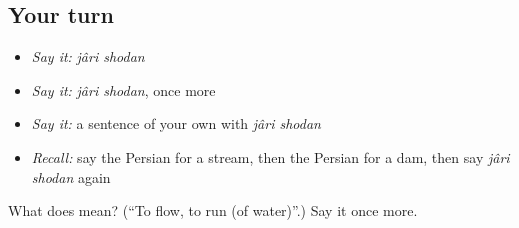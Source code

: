 \subsection*{Your turn}
\begin{itemize}
\raggedright
  \item \emph{Say it:} \emph{jâri shodan}
  \item \emph{Say it:} \emph{jâri shodan}, once more
  \item \emph{Say it:} a sentence of your own with \emph{jâri shodan}
  \item \emph{Recall:} say the Persian for a stream, then the Persian for a dam, then say \emph{jâri shodan} again
\end{itemize}

\begin{tcolorbox}[breakable,colback=teal!4,colframe=teal!35!black,title={Before you move on}]
What does   mean? (\textquotedblleft{}To flow, to run (of water)\textquotedblright{}.) Say it once more.
\end{tcolorbox}
